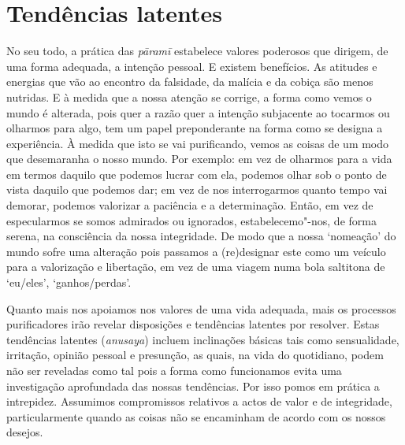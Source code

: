 \section{Tendências latentes}

No seu todo, a prática das \emph{pāramī} estabelece valores poderosos que dirigem, de uma forma adequada, a intenção pessoal. E existem benefícios. As atitudes e energias que vão ao encontro da falsidade, da malícia e da cobiça são menos nutridas. E à medida que a nossa atenção se corrige, a forma como vemos o mundo é alterada, pois quer a razão quer a intenção subjacente ao tocarmos ou olharmos para algo, tem um papel preponderante na forma como se designa a experiência. À medida que isto se vai purificando, vemos as coisas de um modo que desemaranha o nosso mundo. Por exemplo: em vez de olharmos para a vida em termos daquilo que podemos lucrar com ela, podemos olhar sob o ponto de vista daquilo que podemos dar; em vez de nos interrogarmos quanto tempo vai demorar, podemos valorizar a paciência e a determinação. Então, em vez de especularmos se somos admirados ou ignorados, estabelecemo"-nos, de forma serena, na consciência da nossa integridade. De modo que a nossa `nomeação' do mundo sofre uma alteração pois passamos a (re)designar este como um veículo para a valorização e libertação, em vez de uma viagem numa bola saltitona de `eu/eles', `ganhos/perdas'.

Quanto mais nos apoiamos nos valores de uma vida adequada, mais os processos purificadores irão revelar disposições e tendências latentes por resolver. Estas tendências latentes (\emph{anusaya}) incluem inclinações básicas tais como sensualidade, irritação, opinião pessoal e presunção, as quais, na vida do quotidiano, podem não ser reveladas como tal pois a forma como funcionamos evita uma investigação aprofundada das nossas tendências. Por isso pomos em prática a intrepidez. Assumimos compromissos relativos a actos de valor e de integridade, particularmente quando as coisas não se encaminham de acordo com os nossos desejos.

